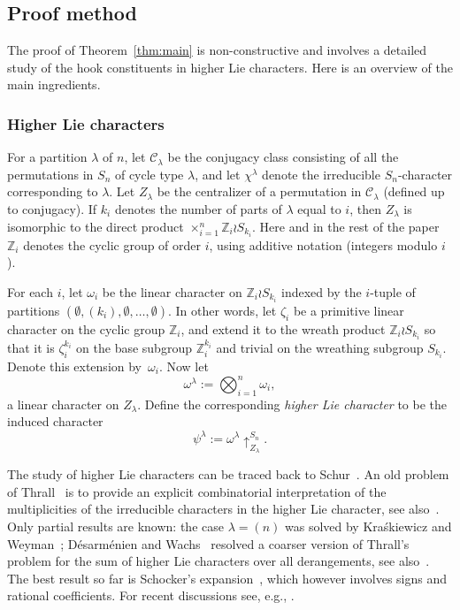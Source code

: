 \documentclass[ALCO,published]{cedram}
\newcommand{\C}{\mathcal C}
\def\ZZ{{\mathbb Z}}
\begin{document}
\subsection{Proof method} 
	
The proof of Theorem~\ref{thm:main} is non-constructive and   
involves a detailed study of the hook constituents in higher Lie characters.
Here is an overview of the main ingredients.


\subsubsection{Higher Lie characters}

\begin{definition}\label{def:higher}
For a partition $\lambda$ of $n$, let $\C_\lambda$ be the conjugacy class consisting of all the permutations in $S_n$ of cycle type $\lambda$,
and let $\chi^\lambda$ denote the irreducible $S_n$-character corresponding to $\lambda$.
Let $Z_\lambda$ be the centralizer of a permutation in $\C_\lambda$ (defined up to conjugacy). 
If $k_i$ denotes the number of parts of $\lambda$ equal to $i$, then $Z_\lambda$ is isomorphic to the direct	product $\times_{i=1}^n \ZZ_i\wr S_{k_i}$.
Here and in the rest of the paper $\ZZ_i$ denotes the cyclic group of order $i$, using additive notation (integers modulo $i$).
	
For each $i$, let $\omega_i$ be the linear character on $\ZZ_i\wr S_{k_i}$ indexed by the
$i$-tuple of partitions $(\emptyset, (k_i), \emptyset,
\dots,\emptyset)$. 
In other words, let $\zeta_i$ be a primitive linear character on the cyclic group $\ZZ_i$, and extend it to the wreath product $\ZZ_i\wr S_{k_i}$ so that it is $\zeta_i^{k_i}$
on the base subgroup $\ZZ_i^{k_i}$ and trivial on the wreathing subgroup $S_{k_i}$. Denote this extension by~$\omega_i$.
Now let
\[
\omega^\lambda := \bigotimes_{i=1}^n \omega_i,
\]
a linear character on $Z_\lambda$. 
Define the corresponding {\em higher Lie character} to be the induced character
\[
\psi^\lambda := \omega^\lambda\uparrow_{Z_\lambda}^{S_n}.
\]
\end{definition}

The study of higher Lie characters can be traced back 
to Schur~\cite{schur}. 
An old problem of Thrall~\cite{thrall} 
is to provide an explicit combinatorial interpretation of the 
multiplicities of the irreducible characters in the higher Lie character,
see also~\cite[Exercise~7.89(i)]{EC2}.
Only partial results are known: the case $\lambda = (n)$ was solved by Kra\'skiewicz and Weyman~\cite{KraskiewiczWeyman};
D\'esarm\'enien and Wachs~\cite{DesarmenienWachs} resolved a coarser version of Thrall's problem 
for the sum of higher Lie characters over all  
derangements, see also~\cite{ReinerWebb}. 
The best result so far is
Schocker's expansion~\cite[Theorem~3.1]{schocker}, which however involves signs and rational coefficients. 
For recent discussions see, e.g., \cite{Reiner, AS, Sundaram}.
\end{document}
